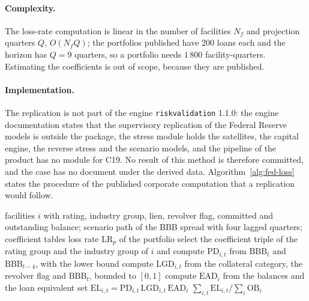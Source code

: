 \paragraph{Complexity.}
The loss-rate computation is linear in the number of facilities $N_f$ and projection quarters $Q$, $O(N_fQ)$; the portfolios
published have 200 loans each and the horizon has $Q=9$ quarters, so a portfolio needs $1\,800$ facility-quarters.
Estimating the coefficients is out of scope, because they are published.

\paragraph{Implementation.}
The replication is not part of the engine \texttt{riskvalidation} 1.1.0: the engine documentation states that the supervisory
replication of the Federal Reserve models is outside the package, the stress module holds the satellites, the capital engine, the
reverse stress and the scenario models, and the pipeline of the product has no module for C19. No result of this method is
therefore committed, and the case has no document under the derived data. Algorithm~\ref{alg:fed-loss} states the procedure of
the published corporate computation that a replication would follow.

\begin{algorithm}[htbp]
\caption{Loss rate of a hypothetical corporate portfolio under the published equations.}
\label{alg:fed-loss}
\begin{algorithmic}[1]
\Require facilities $i$ with rating, industry group, lien, revolver flag, committed and outstanding balance; scenario path of the BBB spread with four lagged quarters; coefficient tables
\Ensure loss rate $\mathrm{LR}_p$ of the portfolio
  \State select the coefficient triple of the rating group and the industry group of $i$ and compute $\mathrm{PD}_{i,t}$ from $\mathrm{BBB}_t$ and $\mathrm{BBB}_{t-4}$, with the lower bound
  \State compute $\mathrm{LGD}_{i,t}$ from the collateral category, the revolver flag and $\mathrm{BBB}_t$, bounded to $[0,1]$
  \State compute $\mathrm{EAD}_i$ from the balances and the loan equivalent
  \State set $\mathrm{EL}_{i,t}=\mathrm{PD}_{i,t}\,\mathrm{LGD}_{i,t}\,\mathrm{EAD}_i$
\EndFor
\State \Return $\sum_{i,t}\mathrm{EL}_{i,t}\big/\sum_i\mathrm{OB}_i$
\end{algorithmic}
\end{algorithm}

